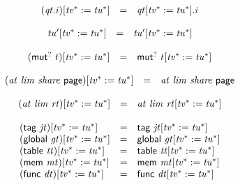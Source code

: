 $$
\begin{array}[t]{@{}lcl@{}l@{}}
{({\mathit{qt}} {.} i)}{{}[ {{\mathit{tv}}^\ast} := {{\mathit{tu}}^\ast} ]} & = & {{\mathit{qt}}}{{}[ {{\mathit{tv}}^\ast} := {{\mathit{tu}}^\ast} ]} {.} i \\
\end{array}
$$

$$
\begin{array}[t]{@{}lcl@{}l@{}}
{{\mathit{tu}'}}{{}[ {{\mathit{tv}}^\ast} := {{\mathit{tu}}^\ast} ]} & = & {{\mathit{tu}'}}{{}[ {{\mathit{tv}}^\ast} := {{\mathit{tu}}^\ast} ]} \\
\end{array}
$$

$$
\begin{array}[t]{@{}lcl@{}l@{}}
{({\mathsf{mut}^?}~t)}{{}[ {{\mathit{tv}}^\ast} := {{\mathit{tu}}^\ast} ]} & = & {\mathsf{mut}^?}~{t}{{}[ {{\mathit{tv}}^\ast} := {{\mathit{tu}}^\ast} ]} \\
\end{array}
$$

$$
\begin{array}[t]{@{}lcl@{}l@{}}
{({\mathit{at}}~{\mathit{lim}}~{\mathit{share}}~\mathsf{page})}{{}[ {{\mathit{tv}}^\ast} := {{\mathit{tu}}^\ast} ]} & = & {\mathit{at}}~{\mathit{lim}}~{\mathit{share}}~\mathsf{page} \\
\end{array}
$$

$$
\begin{array}[t]{@{}lcl@{}l@{}}
{({\mathit{at}}~{\mathit{lim}}~{\mathit{rt}})}{{}[ {{\mathit{tv}}^\ast} := {{\mathit{tu}}^\ast} ]} & = & {\mathit{at}}~{\mathit{lim}}~{{\mathit{rt}}}{{}[ {{\mathit{tv}}^\ast} := {{\mathit{tu}}^\ast} ]} \\
\end{array}
$$

$$
\begin{array}[t]{@{}lcl@{}l@{}}
{(\mathsf{tag}~{\mathit{jt}})}{{}[ {{\mathit{tv}}^\ast} := {{\mathit{tu}}^\ast} ]} & = & \mathsf{tag}~{{\mathit{jt}}}{{}[ {{\mathit{tv}}^\ast} := {{\mathit{tu}}^\ast} ]} \\
{(\mathsf{global}~{\mathit{gt}})}{{}[ {{\mathit{tv}}^\ast} := {{\mathit{tu}}^\ast} ]} & = & \mathsf{global}~{{\mathit{gt}}}{{}[ {{\mathit{tv}}^\ast} := {{\mathit{tu}}^\ast} ]} \\
{(\mathsf{table}~{\mathit{tt}})}{{}[ {{\mathit{tv}}^\ast} := {{\mathit{tu}}^\ast} ]} & = & \mathsf{table}~{{\mathit{tt}}}{{}[ {{\mathit{tv}}^\ast} := {{\mathit{tu}}^\ast} ]} \\
{(\mathsf{mem}~{\mathit{mt}})}{{}[ {{\mathit{tv}}^\ast} := {{\mathit{tu}}^\ast} ]} & = & \mathsf{mem}~{{\mathit{mt}}}{{}[ {{\mathit{tv}}^\ast} := {{\mathit{tu}}^\ast} ]} \\
{(\mathsf{func}~{\mathit{dt}})}{{}[ {{\mathit{tv}}^\ast} := {{\mathit{tu}}^\ast} ]} & = & \mathsf{func}~{{\mathit{dt}}}{{}[ {{\mathit{tv}}^\ast} := {{\mathit{tu}}^\ast} ]} \\
\end{array}
$$

